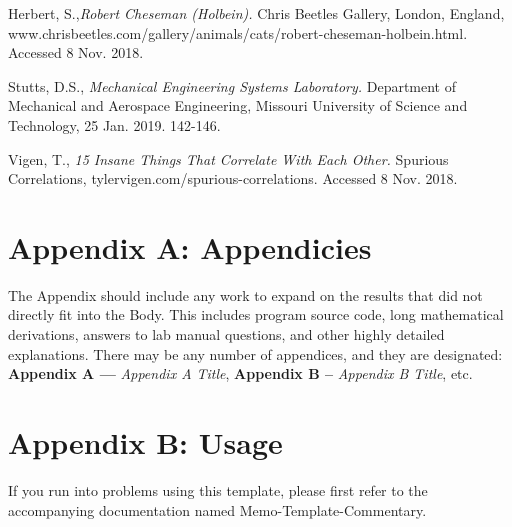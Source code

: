 \documentclass[11pt,letter]{report}
\begin{document}
\begin{thebibliography}{9}

	  Herbert, S.,\emph{Robert Cheseman (Holbein).}
	  Chris Beetles Gallery, London, England, www.chrisbeetles.com/gallery/animals/cats/robert-cheseman-holbein.html. Accessed 8 Nov. 2018.
	  
	  Stutts, D.S., \emph{Mechanical Engineering Systems Laboratory.}
	  Department of Mechanical and Aerospace Engineering, Missouri University of Science and Technology, 25 Jan. 2019. 142-146.
	  
	  Vigen, T., \emph{15 Insane Things That Correlate With Each Other.}
	  Spurious Correlations, tylervigen.com/spurious-correlations. Accessed 8 Nov. 2018.

\end{thebibliography}

\newpage %
\chapter*{Appendix A: Appendicies}
The Appendix should include any work to expand on the results that did not directly fit into the Body. This includes program source code, long mathematical derivations, answers to lab manual questions, and other highly detailed explanations. There may be any number of appendices, and they are designated: \textbf{Appendix A —} \textit{Appendix A Title}, \textbf{Appendix B –} \textit{Appendix B Title}, etc.

\newpage 
\chapter*{Appendix B: Usage}
If you run into problems using this template, please first refer to the accompanying documentation named Memo-Template-Commentary.
\end{document}
